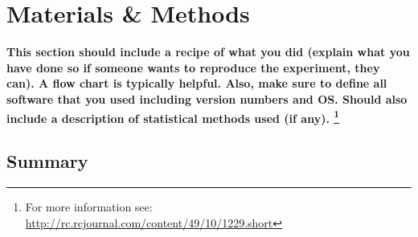 \chapter{Materials \& Methods}

\textbf{This section should include a recipe of what you did (explain what you have done so if someone wants to reproduce the experiment, they can).  A flow chart is typically helpful.  Also, make sure to define all software that you used including version numbers and OS.  Should also include a description of statistical methods used (if any).  \footnote{For more information see: \url{http://rc.rcjournal.com/content/49/10/1229.short}}}

\Blindtext

\section{Summary}
\blindtext